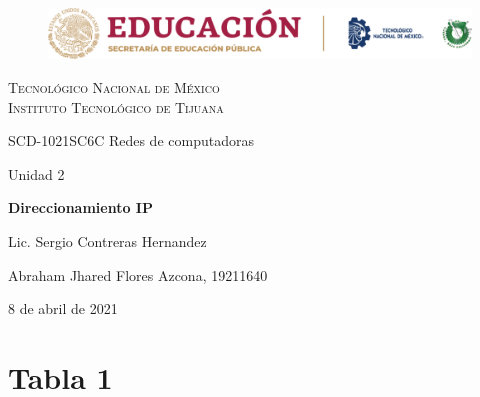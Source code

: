\documentclass[stu, 12pt, letterpaper, donotrepeattitle, floatsintext, natbib]{apa7}
\begin{document}
    \begin{titlepage}
        \begin{figure}[ht]
            \centering
            \includegraphics[width=15cm]{logosITT.png}
        \end{figure}
        \centering
        {\Large\scshape Tecnológico Nacional de México\\Instituto Tecnológico de Tijuana\par}
        \vspace{1cm}
        {\Large SCD-1021SC6C Redes de computadoras\par}
        \vspace{1cm}
        {\Large Unidad 2\par}
        \vspace{2cm}
        {\Large\bfseries Direccionamiento IP\par}
        \vspace{2cm}
        {\large Lic. Sergio Contreras Hernandez\par}
        \vfill
            {\large Abraham Jhared Flores Azcona, 19211640\par}
        \vfill
        {\large 8 de abril de 2021}
    \end{titlepage}

\renewcommand\contentsname{Contenido}

\newpage
\section*{Tabla 1}
\end{document}
